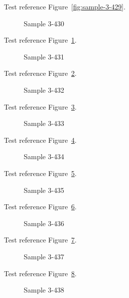 Test reference Figure~\ref{fig:sample-3-429}.

\begin{figure}[tbhp]
\caption{Sample 3-430}
\label{fig:sample-3-430}
\end{figure}

Test reference Figure~\ref{fig:sample-3-430}.

\begin{figure}[tbhp]
\caption{Sample 3-431}
\label{fig:sample-3-431}
\end{figure}

Test reference Figure~\ref{fig:sample-3-431}.

\begin{figure}[tbhp]
\caption{Sample 3-432}
\label{fig:sample-3-432}
\end{figure}

Test reference Figure~\ref{fig:sample-3-432}.

\begin{figure}[tbhp]
\caption{Sample 3-433}
\label{fig:sample-3-433}
\end{figure}

Test reference Figure~\ref{fig:sample-3-433}.

\begin{figure}[tbhp]
\caption{Sample 3-434}
\label{fig:sample-3-434}
\end{figure}

Test reference Figure~\ref{fig:sample-3-434}.

\begin{figure}[tbhp]
\caption{Sample 3-435}
\label{fig:sample-3-435}
\end{figure}

Test reference Figure~\ref{fig:sample-3-435}.

\begin{figure}[tbhp]
\caption{Sample 3-436}
\label{fig:sample-3-436}
\end{figure}

Test reference Figure~\ref{fig:sample-3-436}.

\begin{figure}[tbhp]
\caption{Sample 3-437}
\label{fig:sample-3-437}
\end{figure}

Test reference Figure~\ref{fig:sample-3-437}.

\begin{figure}[tbhp]
\caption{Sample 3-438}
\label{fig:sample-3-438}
\end{figure}

